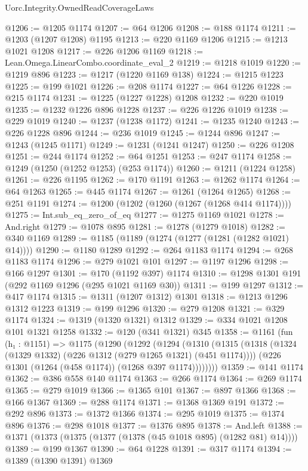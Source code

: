 \begin{lexlean}{Uorc.Integrity.OwnedReadCoverageLaws}
\begin{coremodule}
@1206 := @1205 @1174
@1207 := @64 @1206
@1208 := @188 @1174
@1211 := @1203 (@1207 @1208) @1195
@1213 := @220 @1169 @1206
@1215 := @1213 @1021 @1208
@1217 := @226 @1206 @1169
@1218 := Lean.Omega.LinearCombo.coordinate_eval_2
@1219 := @1218 @1019
@1220 := @1219 @896
@1223 := @1217 (@1220 @1169 @138)
@1224 := @1215 @1223
@1225 := @199 @1021
@1226 := @208 @1174
@1227 := @64 @1226
@1228 := @215 @1174
@1231 := @1225 (@1227 @1228) @1208
@1232 := @220 @1019
@1235 := @1232 @1226 @896 @1228
@1237 := @226 @1226 @1019
@1238 := @229 @1019
@1240 := @1237 (@1238 @1172)
@1241 := @1235 @1240
@1243 := @226 @1228 @896
@1244 := @236 @1019
@1245 := @1244 @896
@1247 := @1243 (@1245 @1171)
@1249 := @1231 (@1241 @1247)
@1250 := @226 @1208
@1251 := @244 @1174
@1252 := @64 @1251
@1253 := @247 @1174
@1258 := @1249 (@1250 (@1252 @1253) (@253 @1174))
@1260 := @1211 (@1224 @1258)
@1261 := @226 @1195
@1262 := @170 @1191
@1263 := @1262 @1174
@1264 := @64 @1263
@1265 := @445 @1174
@1267 := @1261 (@1264 @1265)
@1268 := @251 @1191
@1274 := @1200 (@1202 (@1260 (@1267 (@1268 @414 @1174))))
@1275 := Int.sub_eq_zero_of_eq
@1277 := @1275 @1169 @1021
@1278 := And.right
@1279 := @1078 @895
@1281 := @1278 (@1279 @1018)
@1282 := @340 @1169
@1289 := @1185 (@1189 (@1274 (@1277 (@1281 (@1282 @1021) @14))))
@1290 := @1180 @1289
@1292 := @264 @1183 @1174
@1294 := @268 @1183 @1174
@1296 := @279 @1021 @101
@1297 := @1197 @1296
@1298 := @166 @1297
@1301 := @170 (@1192 @397) @1174
@1310 := @1298 @1301 @191 (@292 @1169 @1296 (@295 @1021 @1169 @30))
@1311 := @199 @1297
@1312 := @417 @1174
@1315 := @1311 (@1207 @1312) @1301
@1318 := @1213 @1296 @1312 @1223
@1319 := @199 @1296
@1320 := @279 @1208
@1321 := @329 @1174
@1324 := @1319 (@1320 @1321) @1312
@1329 := @334 @1021 @1208 @101 @1321 @1258
@1332 := @120 (@341 @1321) @345
@1358 := @1161
    (fun (h₁ : @1151) =>
    @1175
      (@1290
        (@1292
          (@1294
            (@1310
              (@1315
                (@1318 (@1324 (@1329 @1332) (@226 @1312 (@279 @1265 @1321) (@451 @1174))))
                (@226 @1301 (@1264 (@458 @1174)) (@1268 @397 @1174))))))))
@1359 := @141 @1174
@1362 := @386 @558 @140 @1174
@1363 := @266 @1174
@1364 := @269 @1174
@1365 := @279 @1019
@1366 := @1365 @101
@1367 := @897 @1366
@1368 := @166 @1367
@1369 := @288 @1174
@1371 := @1368 @1369 @191
@1372 := @292 @896
@1373 := @1372 @1366
@1374 := @295 @1019
@1375 := @1374 @896
@1376 := @298 @1018
@1377 := @1376 @895
@1378 := And.left
@1388 := @1371 (@1373 (@1375 (@1377 (@1378 (@45 @1018 @895) (@1282 @81) @14))))
@1389 := @199 @1367
@1390 := @64 @1228
@1391 := @317 @1174
@1394 := @1389 (@1390 @1391) @1369

\end{coremodule}
\end{lexlean}
